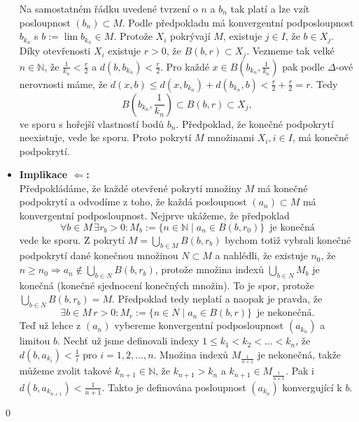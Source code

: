 \documentclass[11pt]{article}
\theoremstyle{nontheoremstyle}
\renewenvironment{proof}{{\noindent\bfseries Důkaz:}}{\qed}
\theoremstyle{nontheoremstylenodot}
\theoremstyle{theoremstyle}
\begin{document}
\begin{proof}
\begin{itemize}
{            Na samostatném řádku uvedené tvrzení o $n$ a $b_n$ tak platí a lze vzít posloupnost $(b_n)\subset M$. Podle předpokladu má konvergentní
            podposloupnost $b_{k_n}$ s $b := \lim b_{k_n} \in M$. Protože $X_i$ pokrývají $M$, existuje $j\in I$, že $b\in X_j$.
            Díky otevřenosti $X_i$ existuje $r > 0$, že $B(b,r)\subset X_j$. Vezmeme tak velké $n \in \mathbb{N}$, že $\frac{1}{k_n} < \frac{r}{2}$
            a $d(b,b_{k_n}) < \frac{r}{2}$. Pro každé $x\in B\left(b_{k_n}, \frac{1}{k_n}\right)$ pak podle $\Delta$-ové nerovnosti máme, že
            $d(x,b)\leq d(x,b_{k_n}) + d(b_{k_n}, b) < \frac{r}{2} + \frac{r}{2} = r.$
            Tedy \[ B\left( b_{k_n}, \frac{1}{k_n}\right)  \subset B(b,r) \subset X_j  , \]
            ve sporu s hořejší vlastností bodů $b_n$. Předpoklad, že konečné podpokrytí neexistuje, vede ke sporu.
            Proto pokrytí $M$ množinami $X_i, i\in I$, má konečné podpokrytí.
        }
        \item {
            \textbf{Implikace $\Leftarrow$:}\\
            Předpokládáme, že každé otevřené pokrytí množiny $M$ má konečné podpokrytí a odvodíme z toho, že
            každá posloupnost $(a_n) \subset M$ má konvergentní podposloupnost.
            Nejprve ukážeme, že předpoklad
            \[ \forall b \in M \, \exists r_b > 0: M_b := \{ n\in\mathbb{N}\mid a_n \in B(b,r_0) \} \,\,\,\text{je konečná} \]
            vede ke sporu. Z pokrytí $M = \bigcup_{b\in M} B(b,r_b)$ bychom totiž vybrali konečné podpokrytí dané
            konečnou množinou $N \subset M$ a nahlédli, že existuje $n_0$, že $n\geq n_0 \Rightarrow a_n \notin \bigcup_{b\in N} B(b,r_b)$,
            protože množina indexů $\bigcup_{b\in N}M_b$ je konečná (konečné sjednocení konečných množin). To je spor,
            protože $\bigcup_{b\in N}B(b,r_b) = M$. Předpoklad tedy neplatí a naopak je pravda, že
            \[ \exists b \in M \, r > 0: M_r := \{ n \in N \mid a_n \in B(b,r) \}\,\,\,\text{je nekonečná}. \]
            Teď už lehce z $(a_n)$ vybereme konvergentní podposloupnost $(a_{k_n})$ a limitou $b$. Nechť už jsme definovali
            indexy $1 \leq k_1 < k_2 < \dots < k_n$, že $d(b,a_{k_i}) < \frac{1}{i}$ pro $i = 1,2,\dots,n$. Množina indexů
            $M_{\frac{1}{n+1}}$ je nekonečná, takže můžeme zvolit takové $k_{n+1} \in \mathbb{N}$, že $k_{n+1} > k_n$
            a $k_{n+1} \in M_{\frac{1}{n+1}}$. Pak i $d(b,a_{k_{n+1}}) < \frac{1}{n+1}$. Takto je definována posloupnost
            $(a_{k_n})$ konvergující k $b$.
        }
    \end{itemize}
\end{proof}
\end{document}
